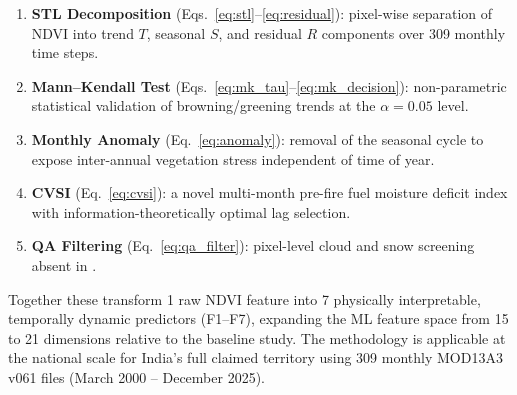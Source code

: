 \documentclass[12pt, a4paper]{article}
\begin{document}
\begin{enumerate}[leftmargin=2em, label=\textbf{NC\arabic*.}]
  \item \textbf{STL Decomposition} (Eqs.~\ref{eq:stl}--\ref{eq:residual}):
        pixel-wise separation of NDVI into trend $T$, seasonal $S$,
        and residual $R$ components over 309 monthly time steps.
  \item \textbf{Mann--Kendall Test} (Eqs.~\ref{eq:mk_tau}--\ref{eq:mk_decision}):
        non-parametric statistical validation of browning/greening
        trends at the $\alpha = 0.05$ level.
  \item \textbf{Monthly Anomaly} (Eq.~\ref{eq:anomaly}):
        removal of the seasonal cycle to expose inter-annual
        vegetation stress independent of time of year.
  \item \textbf{CVSI} (Eq.~\ref{eq:cvsi}):
        a novel multi-month pre-fire fuel moisture deficit index
        with information-theoretically optimal lag selection.
  \item \textbf{QA Filtering} (Eq.~\ref{eq:qa_filter}):
        pixel-level cloud and snow screening absent in \citet{biswas2025}.
\end{enumerate}

Together these transform 1 raw NDVI feature into 7 physically
interpretable, temporally dynamic predictors (F1--F7), expanding the
ML feature space from 15 to 21 dimensions relative to the baseline
study. The methodology is applicable at the national scale for India's
full claimed territory using 309 monthly MOD13A3 v061 files
(March 2000 -- December 2025).

\clearpage



\end{document}
